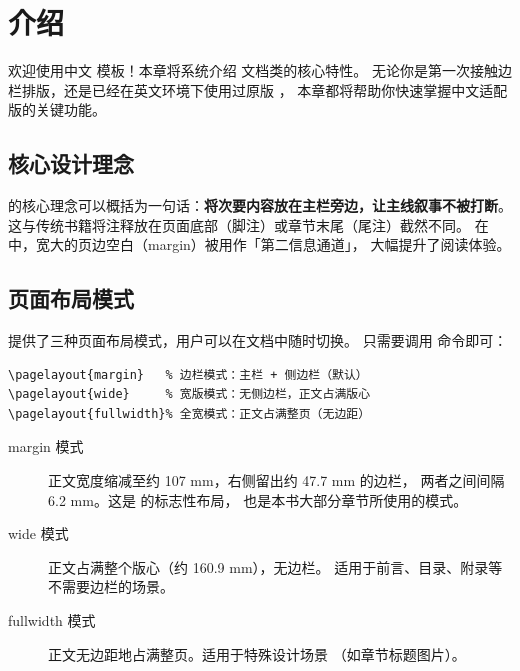 \setchapterpreamble[u]{\margintoc}
\chapter{介绍}

欢迎使用中文  模板！本章将系统介绍  文档类的核心特性。
无论你是第一次接触边栏排版，还是已经在英文环境下使用过原版 ，
本章都将帮助你快速掌握中文适配版的关键功能。


\section{核心设计理念}

 的核心理念可以概括为一句话：\textbf{将次要内容放在主栏旁边，让主线叙事不被打断}。
这与传统书籍将注释放在页面底部（脚注）或章节末尾（尾注）截然不同。
在  中，宽大的页边空白（margin）被用作「第二信息通道」，
大幅提升了阅读体验。


\section{页面布局模式}

 提供了三种页面布局模式，用户可以在文档中随时切换。
只需要调用  命令即可：

\begin{lstlisting}[caption=切换页面布局]
\pagelayout{margin}   % 边栏模式：主栏 + 侧边栏（默认）
\pagelayout{wide}     % 宽版模式：无侧边栏，正文占满版心
\pagelayout{fullwidth}% 全宽模式：正文占满整页（无边距）
\end{lstlisting}


\begin{description}
    \item[margin 模式] 正文宽度缩减至约 107 mm，右侧留出约 47.7 mm 的边栏，
        两者之间间隔 6.2 mm。这是  的标志性布局，
        也是本书大部分章节所使用的模式。
    \item[wide 模式] 正文占满整个版心（约 160.9 mm），无边栏。
        适用于前言、目录、附录等不需要边栏的场景。
    \item[fullwidth 模式] 正文无边距地占满整页。适用于特殊设计场景
        （如章节标题图片）。
\end{description}

